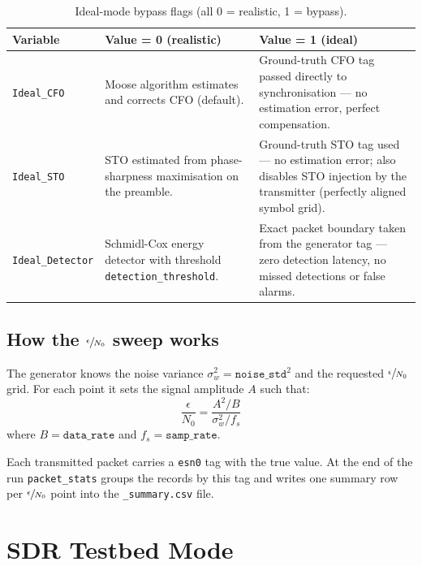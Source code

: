 \begin{table}[H]
\centering
\caption{Ideal-mode bypass flags (all 0 = realistic, 1 = bypass).}
\begin{tabularx}{\linewidth}{>{\small\raggedright\arraybackslash}p{3.0cm} >{\small\raggedright\arraybackslash}X >{\small\raggedright\arraybackslash}X}
\toprule
\textbf{Variable} & \textbf{Value = 0 (realistic)} & \textbf{Value = 1 (ideal)} \\
\midrule
\texttt{Ideal\_CFO} &
  Moose algorithm estimates and corrects CFO (default). &
  Ground-truth CFO tag passed directly to synchronisation — no estimation error,
  perfect compensation. \\[4pt]
\texttt{Ideal\_STO} &
  STO estimated from phase-sharpness maximisation on the preamble. &
  Ground-truth STO tag used — no estimation error; also disables STO injection
  by the transmitter (perfectly aligned symbol grid). \\[4pt]
\texttt{Ideal\_Detector} &
  Schmidl-Cox energy detector with threshold \texttt{detection\_threshold}. &
  Exact packet boundary taken from the generator tag — zero detection latency,
  no missed detections or false alarms. \\
\bottomrule
\end{tabularx}
\end{table}

\subsection*{How the $\sfrac{\epsilon}{N_0}$ sweep works}

The generator knows the noise variance $\sigma_w^2 = \mathtt{noise\_std}^2$ and
the requested $\sfrac{\epsilon}{N_0}$ grid. For each point it sets the signal amplitude $A$ such
that:
\begin{equation}
  \frac{\epsilon}{N_0} = \frac{A^2 / B}{\sigma_w^2 / f_s}
  \label{eq:esn0}
\end{equation}
where $B = \mathtt{data\_rate}$ and $f_s = \mathtt{samp\_rate}$.

Each transmitted packet carries a \texttt{esn0} tag with the true value. At the
end of the run \texttt{packet\_stats} groups the records by this tag and writes
one summary row per $\sfrac{\epsilon}{N_0}$ point into the \texttt{\_summary.csv} file.


\section{SDR Testbed Mode}
\label{sec:sdr}

